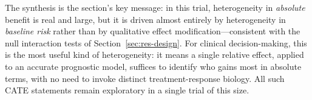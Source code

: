 The synthesis is the section's key message: in this trial, heterogeneity
in \emph{absolute} benefit is real and large, but it is driven almost
entirely by heterogeneity in \emph{baseline risk} rather than by
qualitative effect modification---consistent with the null interaction
tests of Section~\ref{sec:res-design}. For clinical decision-making,
this is the most useful kind of heterogeneity: it means a single
relative effect, applied to an accurate prognostic model, suffices to
identify who gains most in absolute terms, with no need to invoke
distinct treatment-response biology. All such CATE statements remain
exploratory in a single trial of this size.
